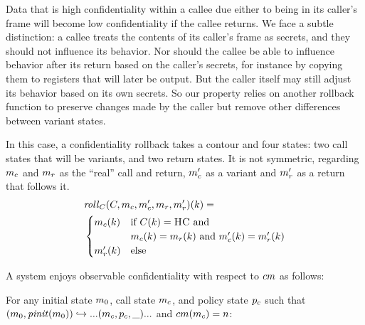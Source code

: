 \documentclass[conference]{IEEEtran}
\begin{document}
      Data that is high confidentiality within a callee due either to being in its caller's frame
      will become low confidentiality if the callee returns. We face a subtle distinction: 
      a callee treats the contents of its caller's frame as secrets, and they should not influence
      its behavior. Nor should the callee be able to influence behavior after its return based
      on the caller's secrets, for instance by copying them to registers that will later be output.
      But the caller itself may still adjust its behavior based on its own secrets. So our property
      relies on another rollback function to preserve changes made by the caller but remove other
      differences between variant states.

      In this case, a confidentiality rollback takes a contour and four states: two call states
      that will be variants, and two return states. It is not symmetric, regarding \(m_c\) and \(m_r\)
      as the ``real'' call and return, \(m_c'\) as a variant and \(m_r'\) as a return that follows it.
      \[\begin{split}
        & \mathit{roll}_C(C,m_c,m_c',m_r,m_r')(k) = \\
        & \begin{cases}
          m_c(k) & \text{if } C(k) = \textsc{HC} \text{ and } \\
                  & m_c(k) = m_r(k) \text{ and }
                    m_c'(k) = m_r'(k) \\
          m_r'(k) & \text{else} \\
        \end{cases}
      \end{split}\]

      A system enjoys observable confidentiality with respect to \(cm\) as follows:

      For any initial state \(m_0\), call state \(m_c\), and policy state \(p_c\) such that
      \((m_0,\mathit{pinit}(m_0)) \hookrightarrow ... (m_c,p_c,\_) ...\) and
      \(cm(m_c) = n\):
\end{document}
